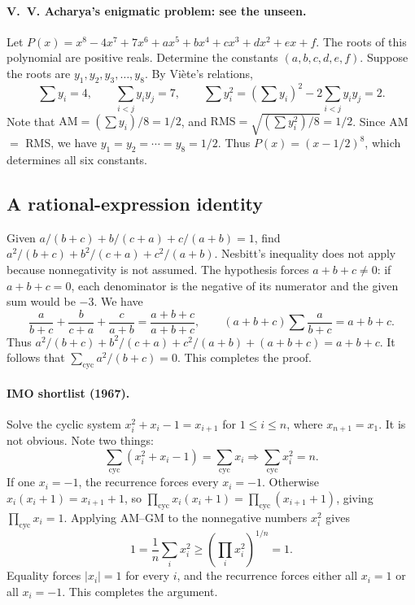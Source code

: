 \documentclass[11pt,a4paper]{article}
\begin{document}

\paragraph{V. V. Acharya's enigmatic problem: see the unseen.}
Let $P(x)=x^8-4x^7+7x^6+ax^5+bx^4+cx^3+dx^2+ex+f$.
The roots of this polynomial are positive reals. Determine the constants $(a,b,c,d,e,f)$.
Suppose the roots are $y_1,y_2,y_3,\ldots,y_8$. By Vi\`ete's relations,
\[\sum y_i=4,\qquad\sum_{i<j}y_iy_j=7,
\qquad\sum y_i^2=\left(\sum y_i\right)^2-2\sum_{i<j}y_iy_j=2.\]
Note that $\mathrm{AM}=(\sum y_i)/8=1/2$, and $\mathrm{RMS}=\sqrt{(\sum y_i^2)/8}=1/2$.
Since AM $=$ RMS, we have $y_1=y_2=\cdots=y_8=1/2$.
Thus $P(x)=(x-1/2)^8$, which determines all six constants.

\subsection{A rational-expression identity}
Given $a/(b+c)+b/(c+a)+c/(a+b)=1$, find
$a^2/(b+c)+b^2/(c+a)+c^2/(a+b)$.
Nesbitt's inequality does not apply because nonnegativity is not assumed.
The hypothesis forces $a+b+c\ne0$: if $a+b+c=0$, each denominator is the
negative of its numerator and the given sum would be $-3$.
We have
\[\frac a{b+c}+\frac b{c+a}+\frac c{a+b}=\frac{a+b+c}{a+b+c},
\qquad (a+b+c)\sum\frac a{b+c}=a+b+c.\]
Thus $a^2/(b+c)+b^2/(c+a)+c^2/(a+b)+(a+b+c)=a+b+c$.
It follows that $\sum_{\mathrm{cyc}}a^2/(b+c)=0$. This completes the proof.

\paragraph{IMO shortlist (1967).}
Solve the cyclic system $x_i^2+x_i-1=x_{i+1}$ for $1\leq i\leq n$, where $x_{n+1}=x_1$.
It is not obvious. Note two things:
\[
\sum_{\mathrm{cyc}}(x_i^2+x_i-1)=\sum_{\mathrm{cyc}}x_i
\Longrightarrow\sum_{\mathrm{cyc}}x_i^2=n.
\]
If one $x_i=-1$, the recurrence forces every $x_i=-1$. Otherwise
$x_i(x_i+1)=x_{i+1}+1$, so
$\prod_{\mathrm{cyc}}x_i(x_i+1)=\prod_{\mathrm{cyc}}(x_{i+1}+1)$,
giving $\prod_{\mathrm{cyc}}x_i=1$. Applying AM--GM to the nonnegative
numbers $x_i^2$ gives
\[
 1=\frac1n\sum_i x_i^2\geq\left(\prod_i x_i^2\right)^{1/n}=1.
\]
Equality forces $|x_i|=1$ for every $i$, and the recurrence forces either
all $x_i=1$ or all $x_i=-1$. This completes the argument.
\end{document}
